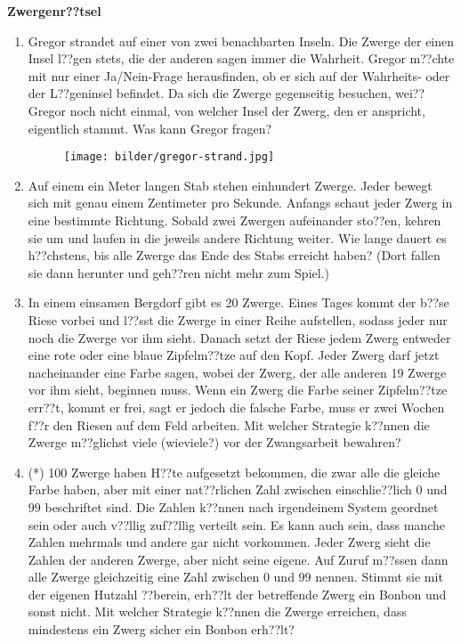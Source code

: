 \documentclass[a4paper,ngerman,12pt]{zirkelblatt1415}
\theoremstyle{definition}
\theoremstyle{plain}
\theoremstyle{remark}
\begin{document}

\begin{center}
  \textbf{\Large Zwergenr??tsel}
\end{center}



\begin{enumerate}
  \item Gregor strandet auf einer von zwei benachbarten Inseln. Die Zwerge der einen Insel l??gen stets, die der anderen sagen immer die Wahrheit. Gregor m??chte mit nur einer Ja/Nein-Frage herausfinden, ob er sich auf der Wahrheits- oder der L??geninsel befindet. Da sich die Zwerge gegenseitig besuchen, wei?? Gregor noch nicht einmal, von welcher Insel der Zwerg, den er anspricht, eigentlich stammt. Was kann Gregor fragen?

\begin{figure}[H]
  \centering
  \texttt{[image: bilder/gregor-strand.jpg]}
\end{figure} 

  \item Auf einem ein Meter langen Stab stehen einhundert Zwerge. Jeder bewegt sich mit genau einem Zentimeter pro Sekunde. Anfangs schaut jeder Zwerg in eine bestimmte Richtung. Sobald zwei Zwergen aufeinander sto??en, kehren sie um und laufen in die jeweils andere Richtung weiter. Wie lange dauert es h??chstens, bis alle Zwerge das Ende des Stabs erreicht haben? (Dort fallen sie dann herunter und geh??ren nicht mehr zum Spiel.)
  \item In einem einsamen Bergdorf gibt es 20 Zwerge. Eines Tages kommt der b??se Riese vorbei und l??sst die Zwerge in einer Reihe aufstellen, sodass jeder nur noch die Zwerge vor ihm sieht. Danach setzt der Riese jedem Zwerg entweder eine rote oder eine blaue Zipfelm??tze auf den Kopf. Jeder Zwerg darf jetzt nacheinander eine Farbe sagen, wobei der Zwerg, der alle anderen 19 Zwerge vor ihm sieht, beginnen muss. Wenn ein Zwerg die Farbe seiner Zipfelm??tze err??t, kommt er frei, sagt er jedoch die falsche Farbe, muss er zwei Wochen f??r den Riesen auf dem Feld arbeiten. Mit welcher Strategie k??nnen die Zwerge m??glichst viele (wieviele?) vor der Zwangsarbeit bewahren?
  \item (*) 100 Zwerge haben H??te aufgesetzt bekommen, die zwar alle die gleiche Farbe haben, aber mit einer nat??rlichen Zahl zwischen einschlie??lich $0$ und $99$ beschriftet sind. Die Zahlen k??nnen nach irgendeinem System geordnet sein oder auch v??llig zuf??llig verteilt sein. Es kann auch sein, dass manche Zahlen mehrmals und andere gar nicht vorkommen. Jeder Zwerg sieht die Zahlen der anderen Zwerge, aber nicht seine eigene. Auf Zuruf m??ssen dann alle Zwerge gleichzeitig eine Zahl zwischen $0$ und $99$ nennen. Stimmt sie mit der eigenen Hutzahl ??berein, erh??lt der betreffende Zwerg ein Bonbon und sonst nicht. Mit welcher Strategie k??nnen die Zwerge erreichen, dass mindestens ein Zwerg sicher ein Bonbon erh??lt?


\end{enumerate}
\end{document}
